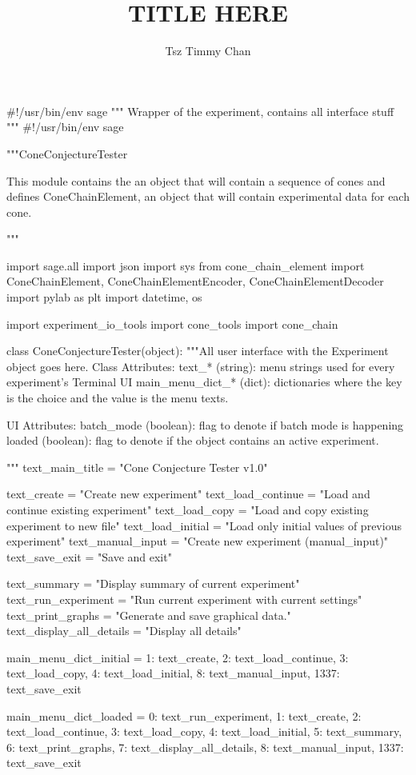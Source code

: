\documentclass{TC}
\title{TITLE HERE}	%
\author{Tsz Timmy Chan}	%
\begin{document}
\begin{SAGE}
#!/usr/bin/env sage
""" Wrapper of the experiment, contains all interface stuff
"""
#!/usr/bin/env sage

"""ConeConjectureTester

This module contains the an object that will contain a sequence of cones
and defines ConeChainElement, an object that will contain experimental data for each cone.

"""

import sage.all
import json 
import sys
from cone_chain_element import ConeChainElement, ConeChainElementEncoder, ConeChainElementDecoder
import pylab as plt
import datetime, os

import experiment_io_tools
import cone_tools
import cone_chain


class ConeConjectureTester(object):
	"""All user interface with the Experiment object goes here.
	Class Attributes:
		text_* (string): menu strings used for every experiment's Terminal UI
		main_menu_dict_* (dict): dictionaries where the key is the choice and the value is the menu texts.

	UI Attributes:
		batch_mode (boolean): flag to denote if batch mode is happening
		loaded (boolean): flag to denote if the object contains an active experiment.
		
	"""
	text_main_title = "Cone Conjecture Tester v1.0"

	text_create = "Create new experiment"
	text_load_continue = "Load and continue existing experiment"
	text_load_copy = "Load and copy existing experiment to new file"
	text_load_initial = "Load only initial values of previous experiment"
	text_manual_input = "Create new experiment (manual_input)"
	text_save_exit = "Save and exit"

	text_summary = "Display summary of current experiment"
	text_run_experiment = "Run current experiment with current settings"
	text_print_graphs = "Generate and save graphical data."
	text_display_all_details = "Display all details"


	main_menu_dict_initial = {1: text_create,
		2: text_load_continue,
		3: text_load_copy,
		4: text_load_initial,
		8: text_manual_input,
		1337: text_save_exit}

	main_menu_dict_loaded =  { 	0: text_run_experiment,
		1: text_create,
		2: text_load_continue,
		3: text_load_copy,
		4: text_load_initial,
		5: text_summary,
		6: text_print_graphs,
		7: text_display_all_details,
		8: text_manual_input,
		1337: text_save_exit}



\end{SAGE}
\end{document}
